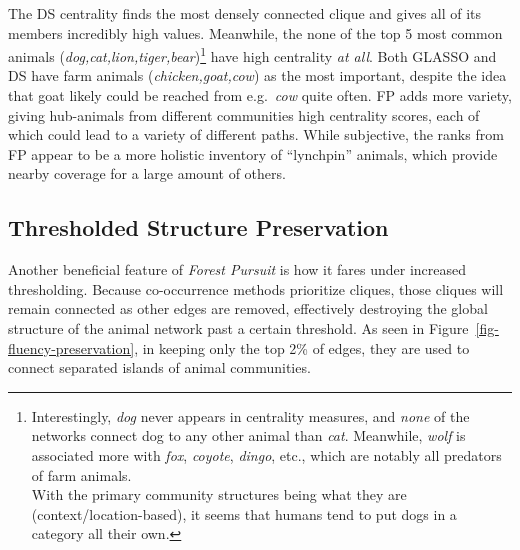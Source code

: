 \documentclass[%
	12pt,
		oneside,
		letterpaper
]{book}
\begin{document}
The DS centrality finds the most densely connected clique and gives all of its members incredibly high values.
Meanwhile, the none of the top 5 most common animals (\emph{dog,cat,lion,tiger,bear})\footnote{Interestingly, \emph{dog} never appears in centrality measures, and \emph{none} of the networks connect dog to any other animal than \emph{cat}.
  Meanwhile, \emph{wolf} is associated more with \emph{fox}, \emph{coyote}, \emph{dingo}, etc., which are notably all predators of farm animals.\\
  With the primary community structures being what they are (context/location-based), it seems that humans tend to put dogs in a category all their own.} have high centrality \emph{at all}.
Both GLASSO and DS have farm animals (\emph{chicken,goat,cow}) as the most important, despite the idea that goat likely could be reached from e.g.~\emph{cow} quite often.
FP adds more variety, giving hub-animals from different communities high centrality scores, each of which could lead to a variety of different paths.
While subjective, the ranks from FP appear to be a more holistic inventory of ``lynchpin'' animals, which provide nearby coverage for a large amount of others.

\subsection{Thresholded Structure Preservation}\label{thresholded-structure-preservation}

Another beneficial feature of \emph{Forest Pursuit} is how it fares under increased thresholding.
Because co-occurrence methods prioritize cliques, those cliques will remain connected as other edges are removed, effectively destroying the global structure of the animal network past a certain threshold.
As seen in Figure~\ref{fig-fluency-preservation}, in keeping only the top 2\% of edges, they are used to connect separated islands of animal communities.
\end{document}
